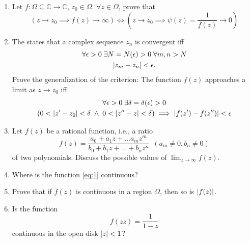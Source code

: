 \documentclass[11pt, oneside]{book}
\begin{document}
\begin{enumerate}
	\item Let $f : \Omega \subseteq \mathbb{C} \to \mathbb{C}$, $z_0 \in \Omega$. $\forall z \in \Omega$, prove that
	\begin{equation*}
		(z \to z_0 \implies f(z) \to \infty) \iff (z \to z_0 \implies \psi(z) = \frac{1}{f(z)} \to 0)
	\end{equation*}

	\item The  states that a complex sequence $z_n$ is convergent iff
	\begin{gather*}
		\forall \epsilon > 0 \; \exists N = N(\epsilon) > 0 \; \forall m, n > N \\
		\left|z_m - z_n\right| < \epsilon.
	\end{gather*}
	Prove the generalization of the criterion: The function $f(z)$ approaches a limit as $z \to z_0$ iff
	\begin{gather*}
		\forall \epsilon > 0 \; \exists \delta = \delta(\epsilon) > 0 \\
		(0 < \left|z' - z_0\right| < \delta \; \land \; 0 < \left|z'' - z\right| < \delta) \implies \left|f(z') - f(z'')\right| < \epsilon
	\end{gather*}

	\item Let $f(z)$ be a rational function, i.e., a ratio
	\begin{equation}\label{eq:1}
		f(z) = \frac{a_0 + a_1 z + \hdots a_m z^m}{b_0 + b_1z + \hdots + b_n z^n} \enspace (a_m \neq 0, b_n \neq 0)
	\end{equation}
	of two polynomials. Discuss the possible values of $\lim_{z \to \infty} f(z)$.

	\item Where is the function \cref{eq:1} continuous?

	\item Prove that if $f(z)$ is continuous in a region $\Omega$, then so is $\left|f(z)\right|$.

	\item Is the function
	\begin{equation*}
		f(zz) = \frac{1}{1 - z}
	\end{equation*}
	continuous in the open disk $\left|z\right| < 1$?
\end{enumerate}


\end{document}
